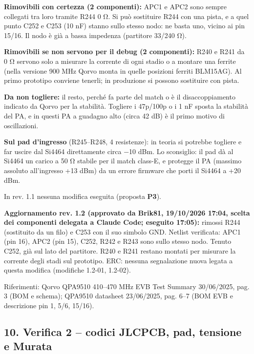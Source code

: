 \textbf{Rimovibili con certezza (2 componenti):} APC1 e APC2 sono sempre collegati tra loro tramite R244 0 Ω. Si può sostituire R244 con una pista, e a quel punto C252 e C253 (10 nF) stanno sullo stesso nodo: ne basta uno, vicino ai pin 15/\allowbreak{}16. Il nodo è già a bassa impedenza (partitore 33/\allowbreak{}240 Ω).

\textbf{Rimovibili se non servono per il debug (2 componenti):} R240 e R241 da 0 Ω servono solo a misurare la corrente di ogni stadio o a montare una ferrite (nella versione 900 MHz Qorvo monta in quelle posizioni ferriti BLM15AG). Al primo prototipo conviene tenerli; in produzione si possono sostituire con pista.

\textbf{Da non togliere:} il resto, perché fa parte del match o è il disaccoppiamento indicato da Qorvo per la stabilità. Togliere i 47p/\allowbreak{}100p o i 1 nF sposta la stabilità del PA, e in questi PA a guadagno alto (circa 42 dB) è il primo motivo di oscillazioni.

\textbf{Sul pad d'ingresso} (R245–R248, 4 resistenze): in teoria si potrebbe togliere e far uscire dal Si4464 direttamente circa −10 dBm. Lo sconsiglio: il pad dà al Si4464 un carico a 50 Ω stabile per il match class-E, e protegge il PA (massimo assoluto all'ingresso +13 dBm) da un errore firmware che porti il Si4464 a +20 dBm.

In rev. 1.1 nessuna modifica eseguita (proposta \textbf{P3}).

\begin{okbox}
\textbf{Aggiornamento rev. 1.2 (approvato da Brik81, 19/\allowbreak{}10/\allowbreak{}2026 17:04, scelta dei componenti delegata a Claude Code; eseguito 17:05):} rimossi R244 (sostituito da un filo) e C253 con il suo simbolo GND. Netlist verificata: APC1 (pin 16), APC2 (pin 15), C252, R242 e R243 sono sullo stesso nodo. Tenuto C252, già sul lato del partitore. R240 e R241 restano montati per misurare la corrente degli stadi sul prototipo. ERC: nessuna segnalazione nuova legata a questa modifica (modifiche 1.2-01, 1.2-02).
\end{okbox}

{\small Riferimenti: Qorvo QPA9510 410–470 MHz EVB Test Summary 30/\allowbreak{}06/\allowbreak{}2025, pag. 3 (BOM e schema); QPA9510 datasheet 23/\allowbreak{}06/\allowbreak{}2025, pag. 6–7 (BOM EVB e descrizione pin 1, 5/\allowbreak{}6, 15/\allowbreak{}16).}

\subsection[10. Verifica 2 – codici JLCPCB, pad, tensione e Murata]{10. Verifica 2 – codici JLCPCB, pad, tensione e Murata }

